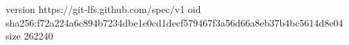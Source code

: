 version https://git-lfs.github.com/spec/v1
oid sha256:f72a224a6c894b7234dbe1e0cd1decf579467f3a56d66a8eb37b4bc5614d8e04
size 262240

